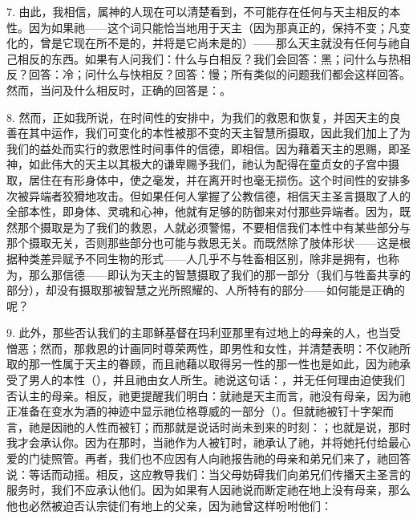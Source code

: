 7. 由此，我相信，属神的人现在可以清楚看到，不可能存在任何与天主相反的本性。因为如果祂——这个词只能恰当地用于天主（因为那真正的，保持不变；凡变化的，曾是它现在所不是的，并将是它尚未是的）——那么天主就没有任何与祂自己相反的东西。如果有人问我们：什么与白相反？我们会回答：黑；问什么与热相反？回答：冷；问什么与快相反？回答：慢；所有类似的问题我们都会这样回答。然而，当问及什么相反时，正确的回答是：。\par

8. 然而，正如我所说，在时间性的安排中，为我们的救恩和恢复，并因天主的良善在其中运作，我们可变化的本性被那不变的天主智慧所摄取，因此我们加上了为我们的益处而实行的救恩性时间事件的信德，即相信。因为藉着天主的恩赐，即圣神，如此伟大的天主以其极大的谦卑赐予我们，祂认为配得在童贞女的子宫中摄取，居住在有形身体中，使之毫发，并在离开时也毫无损伤。这个时间性的安排多次被异端者狡猾地攻击。但如果任何人掌握了公教信德，相信天主圣言摄取了人的全部本性，即身体、灵魂和心神，他就有足够的防御来对付那些异端者。因为，既然那个摄取是为了我们的救恩，人就必须警惕，不要相信我们本性中有某些部分与那个摄取无关，否则那些部分也可能与救恩无关。而既然除了肢体形状——这是根据种类差异赋予不同生物的形式——人几乎不与牲畜相区别，除非是拥有，也称为，那么那信德——即认为天主的智慧摄取了我们的那一部分（我们与牲畜共享的部分），却没有摄取那被智慧之光所照耀的、人所特有的部分——如何能是正确的呢？\par

9. 此外，那些否认我们的主耶稣基督在玛利亚那里有过地上的母亲的人，也当受憎恶；然而，那救恩的计画同时尊荣两性，即男性和女性，并清楚表明：不仅祂所取的那一性属于天主的眷顾，而且祂藉以取得另一性的那一性也是如此，因为祂承受了男人的本性（），并且祂由女人所生。祂说这句话：，并无任何理由迫使我们否认主的母亲。相反，祂更提醒我们明白：就祂是天主而言，祂没有母亲，因为祂正准备在变水为酒的神迹中显示祂位格尊威的一部分（）。但就祂被钉十字架而言，祂是因祂的人性而被钉；而那就是说话时尚未到来的时刻：；也就是说，那时我才会承认你。因为在那时，当祂作为人被钉时，祂承认了祂，并将她托付给最心爱的门徒照管。再者，我们也不应因有人向祂报告祂的母亲和弟兄们来了，祂回答说：等话而动摇。相反，这应教导我们：当父母妨碍我们向弟兄们传播天主圣言的服务时，我们不应承认他们。因为如果有人因祂说而断定祂在地上没有母亲，那么他也必然被迫否认宗徒们有地上的父亲，因为祂曾这样吩咐他们：\par

